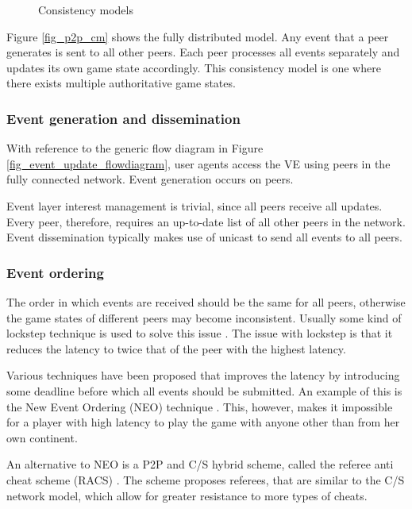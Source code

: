 \begin{figure}[htbp]
\centering {}
\caption{Consistency models}
\end{figure}
%
Figure \ref{fig_p2p_cm} shows the fully distributed model. Any event that a peer generates is sent to all other peers. Each peer processes all events separately and updates its own game state accordingly. This consistency model is one where there exists multiple authoritative game states.

\subsubsection{Event generation and dissemination}

With reference to the generic flow diagram in Figure \ref{fig_event_update_flowdiagram}, user agents access the VE using peers in the fully connected network. Event generation occurs on peers.

Event layer interest management is trivial, since all peers receive all updates. Every peer, therefore, requires an up-to-date list of all other peers in the network. Event dissemination typically makes use of unicast to send all events to all peers.

\subsubsection{Event ordering}
The order in which events are received should be the same for all peers, otherwise the game states of different peers may become inconsistent.
Usually some kind of lockstep technique is used to solve this issue \cite{pessimistic_lock_step}. The issue with lockstep is that it reduces the latency to twice that of the peer with the highest latency.

Various techniques have been proposed that improves the latency by introducing some deadline before which all events should be submitted. An example of this is the New Event Ordering (NEO) technique \cite{cheat_proof_event_ordering}. This, however, makes it impossible for a player with high latency to play the game with anyone other than from her own continent.

An alternative to NEO is a P2P and C/S hybrid scheme, called the referee anti cheat scheme (RACS) \cite{cheating_taxonomy}. The scheme proposes referees, that are similar to the C/S network model, which allow for greater resistance to more types of cheats.

